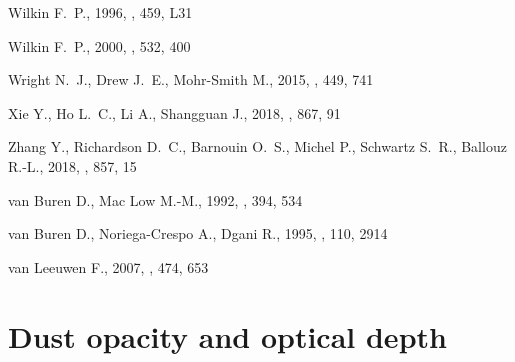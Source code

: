 \documentclass[useAMS, usenatbib, a4paper]{mnras}
\begin{document}
\begin{thebibliography}{}
{Wilkin} F.~P.,  1996, \apjl, 459, L31

{Wilkin} F.~P.,  2000, \apj, 532, 400

{Wright} N.~J.,  {Drew} J.~E.,   {Mohr-Smith} M.,  2015, \mnras, 449, 741

{Xie} Y.,  {Ho} L.~C.,  {Li} A.,   {Shangguan} J.,  2018, \apj, 867, 91

{Zhang} Y.,  {Richardson} D.~C.,  {Barnouin} O.~S.,  {Michel} P.,  {Schwartz}
  S.~R.,   {Ballouz} R.-L.,  2018, \apj, 857, 15

{van Buren} D.,  {Mac Low} M.-M.,  1992, \apj, 394, 534

{van Buren} D.,  {Noriega-Crespo} A.,   {Dgani} R.,  1995, \aj, 110, 2914

{van Leeuwen} F.,  2007, \aap, 474, 653

\makeatother
\end{thebibliography}
 
\appendix

\section{Dust opacity and optical depth}
\label{app:dust-opacity}
\end{document}
